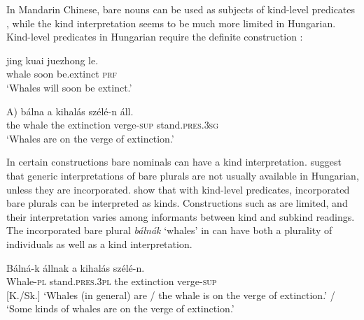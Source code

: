 \documentclass[output=paper]{langscibook}
\begin{document}
In Mandarin Chinese, bare nouns can be used as subjects of kind-level predicates  \citep{li-13}, while the kind interpretation seems to be much more limited in Hungarian. Kind-level predicates in Hungarian require the definite construction :

\ea \label{schv-nem:ex:37} \gll jing kuai juezhong le.\\  
whale soon be.extinct \textsc{prf}\\
\glt `Whales will soon be extinct.'\hfill \citep[Mandarin Chinese;][p. 90, ex. (4)]{li-13}


\ex \gll \minsp{*(} A) bálna a kihalás szélé-n áll.\\  
{} the whale the extinction verge-\textsc{sup} stand.\textsc{pres}.\textsc{3sg}\\ 
\glt `Whales are on the verge of extinction.' \label{schv-nem:ex:38}
\z

\noindent In certain constructions bare nominals can have a kind interpretation. \citet{farkas-deswart-03} suggest that generic interpretations of bare plurals are not usually available in Hungarian, unless they are incorporated. \citet{schvarcz-rothstein-17} show that with kind-level predicates, incorporated bare plurals can be interpreted as kinds. Constructions such as  are limited, and their interpretation varies among informants between kind and subkind readings. The incorporated bare plural \textit{bálnák} `whales' in  can have both a plurality of individuals as well as a kind interpretation.

\ea \label{schv-nem:ex:39}
\gll Bálná-k állnak a kihalás szélé-n.	\\
Whale-\textsc{pl} stand.\textsc{pres}.\textsc{3pl} the  extinction verge-\textsc{sup}\\ \hfill [K./Sk.]
\glt `Whales (in general) are / the whale is on the verge of extinction.' / `Some kinds of whales are on the verge of extinction.'  \\\hfill  \citep[p. 188, (13)]{schvarcz-rothstein-17}
\end{document}
